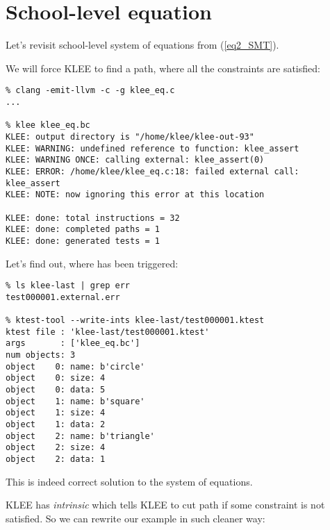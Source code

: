 \section{School-level equation}

Let's revisit school-level system of equations from (\ref{eq2_SMT}).

We will force KLEE to find a path, where all the constraints are satisfied:



\begin{lstlisting}
% clang -emit-llvm -c -g klee_eq.c
...

% klee klee_eq.bc
KLEE: output directory is "/home/klee/klee-out-93"
KLEE: WARNING: undefined reference to function: klee_assert
KLEE: WARNING ONCE: calling external: klee_assert(0)
KLEE: ERROR: /home/klee/klee_eq.c:18: failed external call: klee_assert
KLEE: NOTE: now ignoring this error at this location

KLEE: done: total instructions = 32
KLEE: done: completed paths = 1
KLEE: done: generated tests = 1
\end{lstlisting}

Let's find out, where  has been triggered:

\begin{lstlisting}
% ls klee-last | grep err
test000001.external.err

% ktest-tool --write-ints klee-last/test000001.ktest
ktest file : 'klee-last/test000001.ktest'
args       : ['klee_eq.bc']
num objects: 3
object    0: name: b'circle'
object    0: size: 4
object    0: data: 5
object    1: name: b'square'
object    1: size: 4
object    1: data: 2
object    2: name: b'triangle'
object    2: size: 4
object    2: data: 1
\end{lstlisting}

This is indeed correct solution to the system of equations.

KLEE has \textit{intrinsic}  which tells KLEE to cut path if some constraint is not satisfied.
So we can rewrite our example in such cleaner way:




